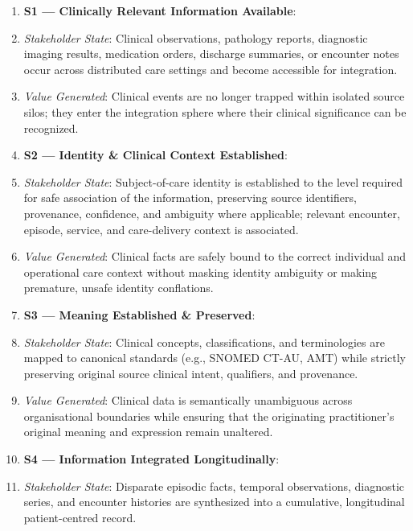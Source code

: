 \begin{enumerate}


\item \textbf{S1 — Clinically Relevant Information Available}:

\item \emph{Stakeholder State}: Clinical observations, pathology reports, diagnostic imaging results, medication orders, discharge summaries, or encounter notes occur across distributed care settings and become accessible for integration.

\item \emph{Value Generated}: Clinical events are no longer trapped within isolated source silos; they enter the integration sphere where their clinical significance can be recognized.

\item \textbf{S2 — Identity \& Clinical Context Established}:

\item \emph{Stakeholder State}: Subject-of-care identity is established to the level required for safe association of the information, preserving source identifiers, provenance, confidence, and ambiguity where applicable; relevant encounter, episode, service, and care-delivery context is associated.

\item \emph{Value Generated}: Clinical facts are safely bound to the correct individual and operational care context without masking identity ambiguity or making premature, unsafe identity conflations.

\item \textbf{S3 — Meaning Established \& Preserved}:

\item \emph{Stakeholder State}: Clinical concepts, classifications, and terminologies are mapped to canonical standards (e.g., SNOMED CT-AU, AMT) while strictly preserving original source clinical intent, qualifiers, and provenance.

\item \emph{Value Generated}: Clinical data is semantically unambiguous across organisational boundaries while ensuring that the originating practitioner's original meaning and expression remain unaltered.

\item \textbf{S4 — Information Integrated Longitudinally}:

\item \emph{Stakeholder State}: Disparate episodic facts, temporal observations, diagnostic series, and encounter histories are synthesized into a cumulative, longitudinal patient-centred record.


\end{enumerate}

